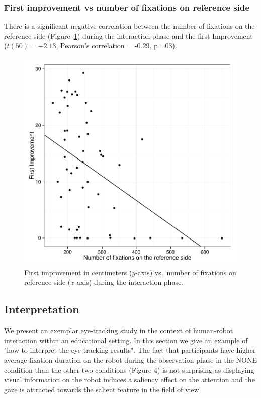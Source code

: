 \documentclass{sig-alternate}
\begin{document}
\subsubsection{First improvement vs number of fixations on reference side}

There is a significant negative correlation between the number of
fixations on the reference side (Figure~\ref{res4}) during the interaction phase
and the first Improvement ($t(50)=-2.13$, Pearson's correlation = -0.29, p=.03).

\begin{figure}[h!]
    \centering
    \includegraphics[width=0.8\linewidth]{corPlotFirstImprove}
    \caption{First improvement in centimeters ($y$-axis) vs.~number of fixations
    on reference side ($x$-axis) during the interaction phase.}
    \label{res4}
\end{figure}


\subsection{Interpretation}

We present an exemplar eye-tracking study in the context of human-robot
interaction within an educational setting. In this section we give an example of "how to interpret the eye-tracking results". The fact that participants have higher average fixation duration on the robot during the observation phase in the {\sf NONE} condition than the other two conditions (Figure 4) is not surprising as displaying visual information on the robot induces a saliency effect on the attention and the gaze is attracted towards the salient feature in the field of view. 
\end{document}
